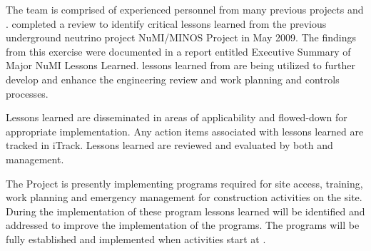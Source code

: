 The  team is comprised of experienced personnel from many
previous projects and .  \fnal completed a review to
identify critical lessons learned from the previous underground
neutrino project NuMI/MINOS Project in May 2009. The findings from this
exercise were documented in a report entitled Executive Summary of
Major NuMI Lessons Learned.   lessons learned from
 are being utilized to further develop and enhance
the  engineering review and work planning and controls
processes.

Lessons learned are disseminated in areas of applicability and
flowed-down for appropriate implementation. Any action items
associated with lessons learned are tracked in iTrack. Lessons learned
are reviewed and evaluated by both \fnal and  management.

The  Project is presently implementing 
programs required for site access, training, work planning and
emergency management for construction activities on the 
site. During the implementation of these program lessons learned will
be identified and addressed to improve the implementation of the 
 programs.  The  programs will be fully
established and implemented when  activities start at
.
